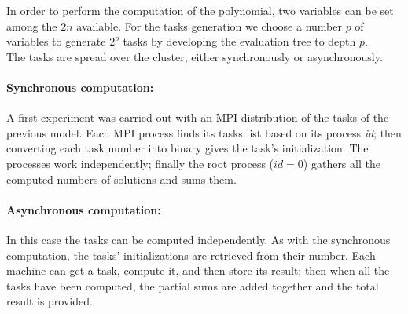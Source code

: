 In order to perform the computation of the polynomial, two variables can be set among the $2n$ available. For the tasks generation we choose a number $p$ of variables to generate $2^p$ tasks by developing the evaluation tree to depth $p$.\\
 
 
The tasks are spread over the cluster, either synchronously or asynchronously.

\paragraph{Synchronous computation: }
A first experiment was carried out with an MPI distribution of the tasks of the previous model. 
Each MPI process finds its tasks list based on its process \textit{id}; then converting each task number into binary gives the task's initialization. 
The processes work independently; finally the root process ($id=0$) gathers all the computed numbers of solutions and sums them.

\paragraph{Asynchronous computation: }
\label{section:asynchronous}
In this case the tasks can be computed independently. 
As with the synchronous computation, the tasks' initializations are retrieved from their number. 
Each machine can get a task,  compute it, and then store its result; then when all the tasks have been computed, the partial sums are added together and the total result is provided. 



